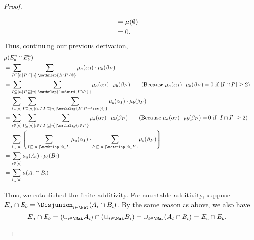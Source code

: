 \begin{proof}
\begin{itemize}
\begin{align}
    &= \mu(\emptyset) \notag \\
    &= 0. \notag
  \end{align}
Thus, continuing our previous derivation,
\begin{align}
   &\mu(E^n_a \cap E^n_b) \notag \\
   &= \sum_{I \subseteq [n]} \sum_{I' \subseteq [n] \mid \mathrlap{I \cap I' \neq \emptyset}}  \mu_a(\alpha_I) \cdot \mu_b (\beta_{I'}) \notag \\
   &= \sum_{I \subseteq [n]}
        \sum_{I' \subseteq [n] \mid \mathrlap{1 = \card{I \cap I'}}}
          \mu_a(\alpha_I) \cdot \mu_b (\beta_{I'})
   \tag{Because $\mu_{a}(\alpha_I) \cdot \mu_{b}(\beta_{I'})=0$ if $|I \cap I'| \geq 2$}\\
   &= \sum_{i \in [n]}
        \sum_{I \subseteq [n] \mid i \in I}
          \sum_{I' \subseteq [n] \mid \mathrlap{I \cap I' = \set{i}} }
            \mu_a(\alpha_I) \cdot \mu_b (\beta_{I'})
      \notag \\
   &= \sum_{i \in [n]} \sum_{I \subseteq [n] \mid i \in I} \sum_{I' \subseteq [n] \mid \mathrlap{i \in I'}}  \mu_a(\alpha_I) \cdot \mu_b (\beta_{I'})
   \tag{Because $\mu_{a}(\alpha_I) \cdot \mu_{b}(\beta_{I'})=0$ if $|I \cap I'| \geq 2$}\\
   &= \sum_{i \in [n]}
         \left\lgroup
         \sum_{I \subseteq [n] \mid \mathrlap{i \in I}} \mu_a(\alpha_I)
         \cdot
         \sum_{I' \subseteq [n] \mid \mathrlap{i \in I'}} \mu_b (\beta_{I'})
         \right\rgroup
     \notag \\
   &= \sum_{i \in [n]} \mu_a(A_i) \cdot \mu_b(B_i) \notag \\
   &= \sum_{i \in [n]} \mu(A_i \cap B_i) \notag
  \end{align}

  Thus, we established the finite additivity.
  For countable additivity, suppose $E_a \cap E_b = \Disjunion_{i \in \Nat}(A_i \cap B_i)$. By the same reason as above, we also have
  \[
    E_a \cap E_b = (\cup_{i \in \Nat} A_i) \cap (\cup_{i \in \Nat} B_i) = \cup_{i \in \Nat} (A_i \cap B_i) = E_a \cap E_b.
  \]



\end{itemize}
\end{proof}
